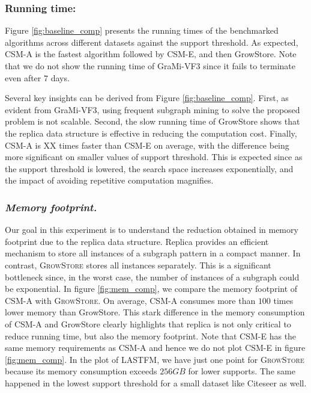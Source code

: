 \subsubsection{Running time: } Figure \ref{fig:baseline_comp} presents the running times of the benchmarked algorithms across different datasets against the support threshold. %
As expected, CSM-A is the fastest algorithm followed by CSM-E, and then GrowStore. Note that we do not show the running time of GraMi-VF3 since it fails to terminate even after $7$ days. 

Several key insights can be derived from Figure \ref{fig:baseline_comp}. First, as evident from GraMi-VF3, using frequent subgraph mining to solve the proposed problem is not scalable. Second, the slow running time of GrowStore shows that the replica data structure is effective in reducing the computation cost. Finally, CSM-A is XX times faster than CSM-E on average, with the difference being more significant on smaller values of support threshold. This is expected since as the support threshold is lowered, the search space increases exponentially, and the impact of avoiding repetitive computation magnifies.

\subsubsection{\textit{Memory footprint.}} Our goal in this experiment is to understand the reduction obtained in memory footprint due to the replica data structure. Replica provides an efficient mechanism to store all instances of a subgraph pattern in a compact manner. In contrast, \textsc{GrowStore} stores all instances separately. This is a significant bottleneck since, in the worst case, the number of instances of a subgraph could be exponential. %
In figure \ref{fig:mem_comp}, we compare the memory footprint of \textsc{CSM-A} with \textsc{GrowStore}. On average, CSM-A consumes more than $100$ times lower memory than GrowStore. This stark difference in the memory consumption of CSM-A and GrowStore clearly highlights that replica is not only critical to reduce running time, but also the memory footprint. Note that CSM-E has the same memory requirements as CSM-A and hence we do not plot CSM-E in figure \ref{fig:mem_comp}. In the plot of LASTFM, we have just one point for \textsc{GrowStore} because its memory consumption exceeds $256 GB$  for lower supports. The same happened in the lowest support threshold for a small dataset like Citeseer as well. 


